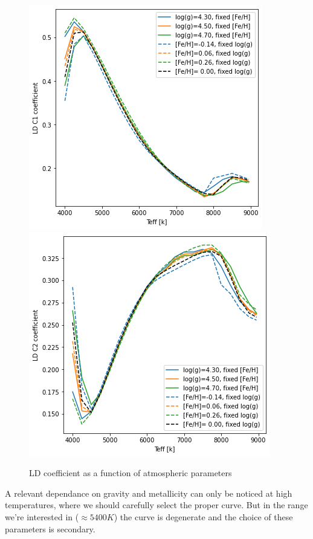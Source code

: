 \documentclass[a4paper,11pt,twocolumn]{article}
\begin{document}
\begin{figure}[H]
    \centering  
    \includegraphics[scale=0.5, angle=0]{../pictures/Claret2017/2017_c1}
    \includegraphics[scale=0.5, angle=0]{../pictures/Claret2017/2017_c2}
    \caption{LD coefficient as a function of atmospheric parameters}
\end{figure}
A relevant dependance on gravity and metallicity can only be noticed at 
high temperatures, where we should carefully select the proper curve. But 
in the range we're interested in ($\approx 5400 K$) the curve is 
degenerate and the choice of these parameters is secondary.
\end{document}
